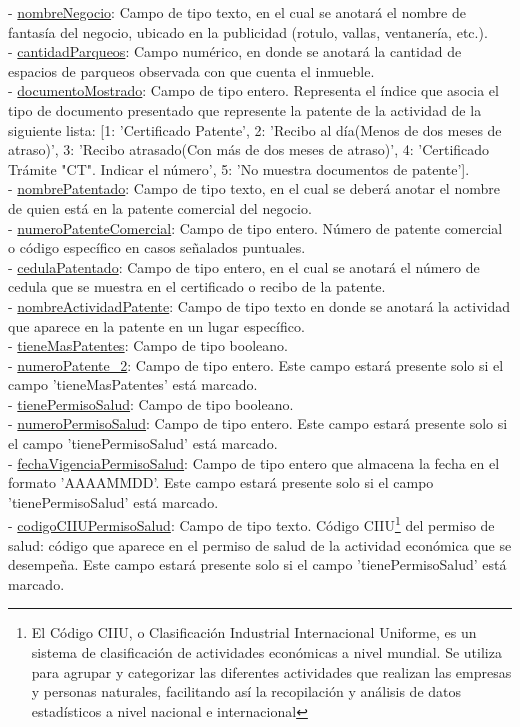 - \underline{nombreNegocio}:  Campo de tipo texto, en el cual se anotará el nombre de fantasía del negocio, ubicado en la publicidad (rotulo, vallas, ventanería, etc.). \\
- \underline{cantidadParqueos}: Campo numérico, en donde se anotará la cantidad de espacios de parqueos observada con que cuenta el inmueble. \\
- \underline{documentoMostrado}: Campo de tipo entero. Representa el índice que asocia el tipo de documento presentado que represente la patente de la actividad de la siguiente lista: [1: 'Certificado Patente', 2: 'Recibo al día(Menos de dos meses de atraso)', 3: 'Recibo atrasado(Con más de dos meses de atraso)', 4: 'Certificado Trámite "$ $CT". Indicar el número', 5: 'No muestra documentos de patente']. \\
- \underline{nombrePatentado}: Campo de tipo texto, en el cual se deberá anotar el nombre de quien está en la patente comercial del negocio. \\
- \underline{numeroPatenteComercial}: Campo de tipo entero. Número de patente comercial o código específico en casos señalados puntuales. \\
- \underline{cedulaPatentado}: Campo de tipo entero, en el cual se anotará el número de cedula que se muestra en el certificado o recibo de la patente. \\
- \underline{nombreActividadPatente}: Campo de tipo texto en donde se anotará la actividad que aparece en la patente en un lugar específico. \\
- \underline{tieneMasPatentes}: Campo de tipo booleano. \\
- \underline{numeroPatente\_2}: Campo de tipo entero. Este campo estará presente solo si el campo 'tieneMasPatentes' está marcado. \\
- \underline{tienePermisoSalud}: Campo de tipo booleano. \\
- \underline{numeroPermisoSalud}: Campo de tipo entero. Este campo estará presente solo si el campo 'tienePermisoSalud' está marcado. \\
- \underline{fechaVigenciaPermisoSalud}: Campo de tipo entero que almacena la fecha en el formato 'AAAAMMDD'. Este campo estará presente solo si el campo 'tienePermisoSalud' está marcado. \\
- \underline{codigoCIIUPermisoSalud}: Campo de tipo texto. Código CIIU\footnote{El Código CIIU, o Clasificación Industrial Internacional Uniforme, es un sistema de clasificación de actividades económicas a nivel mundial. Se utiliza para agrupar y categorizar las diferentes actividades que realizan las empresas y personas naturales, facilitando así la recopilación y análisis de datos estadísticos a nivel nacional e internacional} del permiso de salud: código que aparece en el permiso de salud de la actividad económica que se desempeña. Este campo estará presente solo si el campo 'tienePermisoSalud' está marcado. \\
